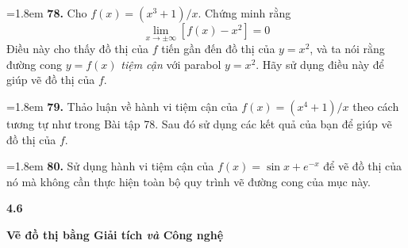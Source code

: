 \documentclass[10pt]{article}
\begin{document}
\noindent
\begin{minipage}[t]{0.47\textwidth}
  \fontsize{9.3}{11.5}\selectfont
  \hangindent=1.8em
  \textbf{78.} Cho $f(x) = (x^3 + 1)/x$. Chứng minh rằng
  \setlength{\abovedisplayskip}{3pt}
  \setlength{\belowdisplayskip}{3pt}
  \[
  \lim_{x \to \pm\infty} [f(x) - x^2] = 0
  \]
  Điều này cho thấy đồ thị của $f$ tiến gần đến đồ thị của $y = x^2$, và ta nói rằng đường cong $y = f(x)$ \emph{tiệm cận} với parabol $y = x^2$. Hãy sử dụng điều này để giúp vẽ đồ thị của $f$.
\end{minipage}%
\hfill
\begin{minipage}[t]{0.49\textwidth}
  \fontsize{9.3}{11.5}\selectfont
  \hangindent=1.8em
  \textbf{79.} Thảo luận về hành vi tiệm cận của $f(x) = (x^4 + 1)/x$ theo cách tương tự như trong Bài tập 78. Sau đó sử dụng các kết quả của bạn để giúp vẽ đồ thị của $f$.

  \vspace{0.6em}
  \hangindent=1.8em
  \textbf{80.} Sử dụng hành vi tiệm cận của $f(x) = \sin x + e^{-x}$ để vẽ đồ thị của nó mà không cần thực hiện toàn bộ quy trình vẽ đường cong của mục này.
\end{minipage}

\vspace{1.2em}

\noindent
\begin{minipage}[c]{0.26\textwidth}
  \hfill
  {\fontsize{24}{26}\selectfont\bfseries\color{stewartcyan}4.6}%
\end{minipage}%
\hspace{0.03\textwidth}%
\begin{minipage}[c]{0.71\textwidth}
  {\fontsize{17}{20}\selectfont\bfseries\textsf{Vẽ đồ thị bằng Giải tích \emph{và} Công nghệ}}
\end{minipage}
\end{document}

